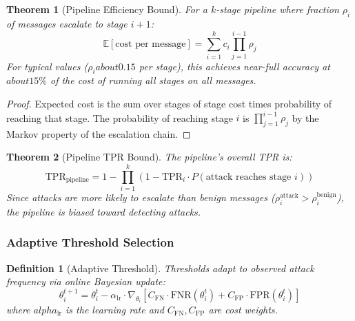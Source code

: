 \documentclass[
]{article}
\newtheorem{definition}{Definition}[section]
\newtheorem{theorem}{Theorem}[section]
\begin{document}
\begin{theorem}[Pipeline Efficiency Bound]
\label{thm:pipeline-efficiency}
For a $k$-stage pipeline where fraction $\rho_i$ of messages escalate to stage $i+1$:
\begin{equation}
\label{eq:pipeline-cost}
\mathbb{E}[\text{cost per message}] = \sum_{i=1}^{k} c_i \prod_{j=1}^{i-1} \rho_j
\end{equation}
For typical values ($\rho_i about 0.15$ per stage), this achieves near-full accuracy at $about 15\%$ of the cost of running all stages on all messages.
\end{theorem}

\begin{proof}
Expected cost is the sum over stages of stage cost times probability of reaching that stage. The probability of reaching stage $i$ is $\prod_{j=1}^{i-1} \rho_j$ by the Markov property of the escalation chain.
\end{proof}

\begin{theorem}[Pipeline TPR Bound]
\label{thm:pipeline-tpr}
The pipeline's overall TPR is:
\begin{equation}
\label{eq:pipeline-tpr}
\text{TPR}_{\text{pipeline}} = 1 - \prod_{i=1}^{k}(1 - \text{TPR}_i \cdot P(\text{attack reaches stage } i))
\end{equation}
Since attacks are more likely to escalate than benign messages ($\rho_i^{\text{attack}} > \rho_i^{\text{benign}}$), the pipeline is biased toward detecting attacks.
\end{theorem}

\subsubsection{Adaptive Threshold
Selection}\label{adaptive-threshold-selection}

\begin{definition}[Adaptive Threshold]
\label{def:adaptive-threshold}
Thresholds adapt to observed attack frequency via online Bayesian update:
\begin{equation}
\label{eq:adaptive-threshold}
\theta_i^{t+1} = \theta_i^t - \alpha_{\text{lr}} \cdot \nabla_{\theta_i} \left[C_{\text{FN}} \cdot \text{FNR}(\theta_i^t) + C_{\text{FP}} \cdot \text{FPR}(\theta_i^t)\right]
\end{equation}
where $alpha_{\text{lr}}$ is the learning rate and $C_{\text{FN}}, C_{\text{FP}}$ are cost weights.
\end{definition}
\end{document}
